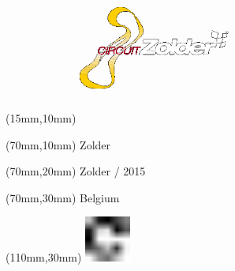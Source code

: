 \null\newpage
\begin{textblock*}{50mm}(15mm,10mm)%
\includegraphics[width=50mm]{LG/ZOL.png}
\end{textblock*}
\begin{textblock*}{130mm}(70mm,10mm)%
{\fontsize{20}{20}\selectfont Zolder}\\
\end{textblock*}
\begin{textblock*}{120mm}(70mm,20mm)%
{\fontsize{16}{16}\selectfont Zolder / 2015}\\
\end{textblock*}
\begin{textblock*}{120mm}(70mm,30mm)%
{\fontsize{12}{12}\selectfont Belgium}
\end{textblock*}
\begin{textblock*}{30mm}(110mm,30mm)%
\centering
\includegraphics[height=15mm]{icons/fa-rotate-right.pdf}
\end{textblock*}
